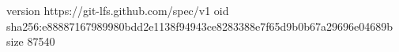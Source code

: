 version https://git-lfs.github.com/spec/v1
oid sha256:e88887167989980bdd2e1138f94943ce8283388e7f65d9b0b67a29696e04689b
size 87540
